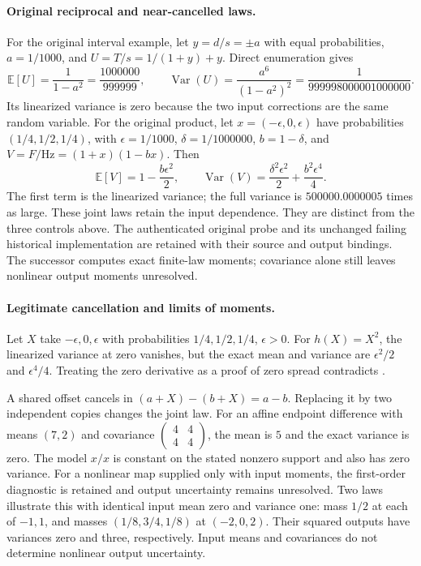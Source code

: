 \paragraph{Original reciprocal and near-cancelled laws.}
For the original interval example, let \(y=d/s=\pm a\) with equal
probabilities, \(a=1/1000\), and \(U=T/s=1/(1+y)+y\). Direct enumeration gives
\begin{equation}
 \mathbb E[U]=\frac{1}{1-a^2}=\frac{1000000}{999999},\qquad
 \operatorname{Var}(U)=\frac{a^6}{(1-a^2)^2}
 =\frac{1}{999998000001000000}.
 \label{eq:manual-m3-original-interval}
\end{equation}
Its linearized variance is zero because the two input corrections are
the same random variable.
For the original product, let \(x=(-\epsilon,0,\epsilon)\) have probabilities
\((1/4,1/2,1/4)\), with \(\epsilon=1/1000\), \(\delta=1/1000000\),
\(b=1-\delta\), and \(V=F/\mathrm{Hz}=(1+x)(1-bx)\). Then
\begin{equation}
 \mathbb E[V]=1-\frac{b\epsilon^2}{2},\qquad
 \operatorname{Var}(V)=\frac{\delta^2\epsilon^2}{2}
                       +\frac{b^2\epsilon^4}{4}.
 \label{eq:manual-m3-original-product}
\end{equation}
The first term is the linearized variance; the full variance is
\(500000.0000005\) times as large. These joint laws retain the input
dependence. They are distinct from the three controls above.
The authenticated original probe and its unchanged failing historical
implementation are retained with their source and output bindings.
The successor computes exact finite-law moments; covariance alone still
leaves nonlinear output moments unresolved.

\paragraph{Legitimate cancellation and limits of moments.}
Let \(X\) take \(-\epsilon,0,\epsilon\) with probabilities
\(1/4,1/2,1/4\), \(\epsilon>0\). For \(h(X)=X^2\), the linearized
variance at zero vanishes, but the exact mean and variance are
\(\epsilon^2/2\) and \(\epsilon^4/4\). Treating the zero derivative as a
proof of zero spread contradicts .

A shared offset cancels in \((a+X)-(b+X)=a-b\). Replacing it by two
independent copies changes the joint law.
For an affine endpoint difference with means \((7,2)\) and covariance
\(\left(\begin{smallmatrix}4&4\\4&4\end{smallmatrix}\right)\), the mean is
\(5\) and the exact variance is zero. The model \(x/x\) is constant on the
stated nonzero support and also has zero variance.
For a nonlinear map supplied only with input moments, the first-order diagnostic
is retained and output uncertainty remains unresolved.
Two laws illustrate this with identical input mean zero and
variance one: mass \(1/2\) at each of \(-1,1\), and masses \((1/8,3/4,1/8)\)
at \((-2,0,2)\). Their squared outputs have variances zero and three,
respectively. Input means and covariances do not determine nonlinear output
uncertainty.

